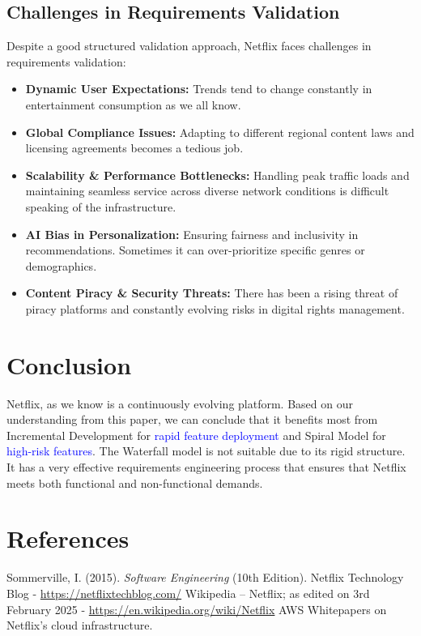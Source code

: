 \documentclass[a4paper,10pt,twoside]{article}
\begin{document}
\subsection{Challenges in Requirements Validation}
Despite a good structured validation approach, Netflix faces challenges in requirements validation:
\begin{itemize}
    \item \textbf{Dynamic User Expectations: } Trends tend to change constantly in entertainment consumption as we all know.
    \item \textbf{Global Compliance Issues: } Adapting to different regional content laws and licensing agreements becomes a tedious job.
    \item \textbf{Scalability \& Performance Bottlenecks: } Handling peak traffic loads and maintaining seamless service across diverse network conditions is difficult speaking of the infrastructure.
    \item \textbf{AI Bias in Personalization: } Ensuring fairness and inclusivity in recommendations. Sometimes it can over-prioritize specific genres or demographics.
    \item \textbf{Content Piracy \& Security Threats: } There has been a rising threat of piracy platforms and constantly evolving risks in digital rights management.
\end{itemize}
\newpage
\section{Conclusion}
Netflix, as we know is a continuously evolving platform. Based on our understanding from this paper, we can conclude that it benefits most from Incremental Development for \textcolor{Blue}{rapid feature deployment} and Spiral Model for \textcolor{Blue}{high-risk features}. The Waterfall model is not suitable due to its rigid structure.
It has a very effective requirements engineering process that ensures that Netflix meets both functional and non-functional demands.

\section{References}
\begin{thebibliography}{9}
     Sommerville, I. (2015). \textit{Software Engineering} (10th Edition).
     Netflix Technology Blog - \url{https://netflixtechblog.com/}
     Wikipedia – Netflix; as edited on 3rd February 2025  - \url{https://en.wikipedia.org/wiki/Netflix}
     AWS Whitepapers on Netflix’s cloud infrastructure.
\end{thebibliography}
\end{document}

